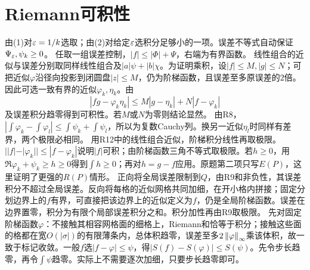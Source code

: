 \documentclass[UTF8,fontset=fandol,11pt]{ctexart}
\begin{document}
\section{Riemann可积性}
由(1)对$\varepsilon=1/k$选取；由(2)对给定$\varepsilon$选积分足够小的一项。误差不等式自动保证$\Psi_\varepsilon,\psi_k\ge0$。
任取一组误差控制，$|f|\le|\Phi|+\Psi$，右端为有界函数。
线性组合的近似与误差分别取同样线性组合及$|a|\psi+|b|\chi$。为证明乘积，设$|f|\le M,|g|\le N$；可把近似$\varphi$沿径向投影到闭圆盘$|z|\le M$，仍为阶梯函数，且误差至多原误差的$2$倍。因此可选一致有界的近似$\varphi_k,\eta_k$。由
\[|fg-\varphi_k\eta_k|\le M|g-\eta_k|+N|f-\varphi_k|\]
及误差积分趋零得到可积性。若$M$或$N$为零则结论显然。
由R8，$|\int\varphi_k-\int\varphi_l|\le\int\psi_k+\int\psi_l$，所以为复数Cauchy列。换另一近似$\eta_l$时同样有差界，两个极限必相同。
用R12中的线性组合近似，阶梯积分线性再取极限。
$||f|-|\varphi_k||\le|f-\varphi_k|$说明$|f|$可积；由阶梯函数三角不等式取极限。若$h\ge0$，用$\Re\varphi_k+\psi_k\ge h\ge0$得到$\int h\ge0$；再对$h=g-f$应用。原题第二项只写$E(P)$，这里证明了更强的$R(P)$情形。
正向将全局误差限制到$Q$，由R9和非负性，其误差积分不超过全局误差。反向将每格的近似网格共同加细，在开小格内拼接；固定分划边界上的$f$有界，可直接把该边界上的近似定义为$f$，仍是全局阶梯函数。误差在边界置零，积分为有限个局部误差积分之和。积分加性再由R9取极限。
先对固定阶梯函数$\varphi$：不接触其相容网格面的细格上，Riemann和恰等于积分；接触这些面的格都在宽$O(|\sigma|)$的有限薄条内，总体积趋零，误差至多$2\left\lVert\varphi\right\rVert_\infty$乘该体积，故一致于标记收敛。一般$f$选$|f-\varphi|\le\psi$，得$|S(f)-S(\varphi)|\le S(\psi)$。先令步长趋零，再令$\int\psi$趋零。实际上不需要逐次加细，只要步长趋零即可。
\end{document}
